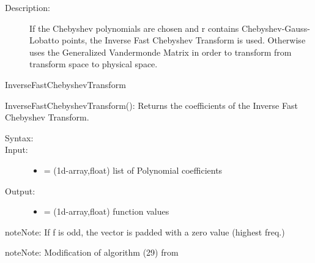\documentclass[letterpaper,10pt,english]{sphinxmanual}
\begin{document}
\begin{fulllineitems}
\begin{fulllineitems}
\begin{description}
\begin{itemize}
\end{itemize}

\item[{Description:}] \leavevmode
If the Chebyshev polynomials are chosen and r contains Chebyshev-Gauss-Lobatto points, the Inverse Fast Chebyshev Transform is used. Otherwise uses the Generalized Vandermonde Matrix in order to transform from transform space to physical space.

\end{description}




InverseFastChebyshevTransform



\end{fulllineitems}


\begin{fulllineitems}
\label{index:SpectralToolbox.Spectral1D.Poly1D.InverseFastChebyshevTransform}
InverseFastChebyshevTransform(): Returns the coefficients of the Inverse Fast Chebyshev Transform.
\begin{description}
\item[{Syntax:}] \leavevmode
{}

\item[{Input:}] \leavevmode\begin{itemize}
\item {} 
 = (1d-array,float) list of Polynomial coefficients

\end{itemize}

\item[{Output:}] \leavevmode\begin{itemize}
\item {} 
 = (1d-array,float) function values

\end{itemize}

\end{description}

\begin{notice}{note}{Note:}
If f is odd, the vector is padded with a zero value (highest freq.)
\end{notice}

\begin{notice}{note}{Note:}
Modification of algorithm (29) from \footnotemark[1]
\end{notice}


\end{fulllineitems}
\end{fulllineitems}
\end{document}

